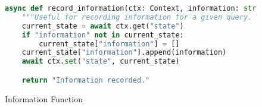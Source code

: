 \begin{figure}[h]
	\centering
	\small
	\begin{lstlisting}[language=Python, breaklines=true]
async def record_information(ctx: Context, information: str) -> str:
    """Useful for recording information for a given query. Your input should be information written in plain text."""
    current_state = await ctx.get("state")
    if "information" not in current_state:
        current_state["information"] = []
    current_state["information"].append(information)
    await ctx.set("state", current_state)

    return "Information recorded."
    \end{lstlisting}
	\caption{Information Function}
	\label{fig:InformationFunc}
\end{figure}
